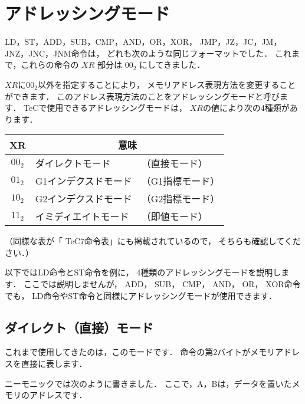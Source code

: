\begin{center}
\end{center}

\newpage
\section{アドレッシングモード}
LD，ST，ADD，SUB，CMP，AND，OR，XOR，
JMP，JZ，JC，JM，JNZ，JNC，JNM命令は，
どれも次のような同じフォーマットでした．
これまで，これらの命令の $XR$ 部分は $00_2$ にしてきました．

\twoByte{\OP}{\GR~\XR}{\A}

$XR$に$00_2$以外を指定することにより，
メモリアドレス表現方法を変更することができます．
このアドレス表現方法のことをアドレッシングモードと呼びます．
TeCで使用できるアドレッシングモードは，
$XR$の値により次の4種類があります．

{\small\begin{center}
\begin{tabular}{c|l l}
\hline
\hline
XR & \multicolumn{2}{|c}{意味} \\
\hline
$00_2$ & ダイレクトモード     & （直接モード）   \\
$01_2$ & G1インデクスドモード & （G1指標モード） \\
$10_2$ & G2インデクスドモード & （G2指標モード） \\
$11_2$ & イミディエイトモード & （即値モード）   \\
\end{tabular}
\end{center}}

（同様な表が「 TeC7命令表」にも掲載されているので，
そちらも確認してください．）

以下ではLD命令とST命令を例に，
4種類のアドレッシングモードを説明します．
ここでは説明しませんが，
ADD， SUB， CMP， AND， OR， XOR命令でも，
LD命令やST命令と同様にアドレッシングモードが使用できます．

\subsection{ダイレクト（直接）モード}
これまで使用してきたのは，このモードです．
命令の第2バイトがメモリアドレスを直接に表します．

ニーモニックでは次のように書きました．
ここで，A，Bは，データを置いたメモリのアドレスです．

